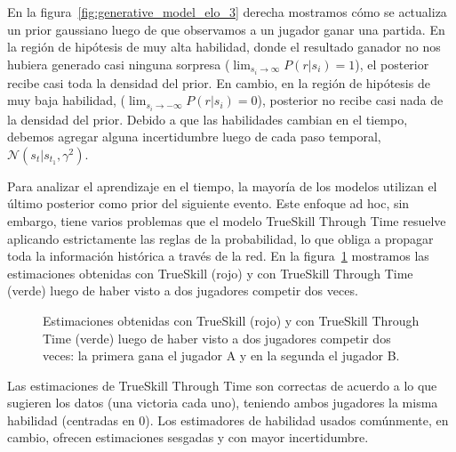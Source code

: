 \documentclass[a4paper,11pt]{book}
\newcommand{\N}{\mathcal{N}}
\theoremstyle{definition}
\begin{document}

En la figura~\ref{fig:generative_model_elo_3} derecha mostramos c\'omo se actualiza un prior gaussiano luego de que observamos a un jugador ganar una partida.
%
En la regi\'on de hip\'otesis de muy alta habilidad, donde el resultado ganador no nos hubiera generado casi ninguna sorpresa ($\lim_{s_i \to \infty}P(r|s_i) = 1$), el posterior recibe casi toda la densidad del prior.
%
En cambio, en la regi\'on de hip\'otesis de muy baja habilidad, ($\lim_{s_i \to -\infty}P(r|s_i) = 0$), posterior no recibe casi nada de la densidad del prior.
%
Debido a que las habilidades cambian en el tiempo, debemos agregar alguna incertidumbre luego de cada paso temporal, $\N(s_t | s_{t_1}, \gamma^2)$.


Para analizar el aprendizaje en el tiempo, la mayor\'ia de los modelos utilizan el \'ultimo posterior como prior del siguiente evento.
%
Este enfoque ad hoc, sin embargo, tiene varios problemas que el modelo TrueSkill Through Time resuelve aplicando estrictamente las reglas de la probabilidad, lo que obliga a propagar toda la informaci\'on hist\'orica a trav\'es de la red.
%
En la figura~\ref{fig:trueskillthroughtime} mostramos las estimaciones obtenidas con TrueSkill (rojo) y con TrueSkill Through Time (verde) luego de haber visto a dos jugadores competir dos veces.
%
\begin{figure}[ht!]
\centering
{}
\caption{
 Estimaciones obtenidas con TrueSkill (rojo) y con TrueSkill Through Time (verde) luego de haber visto a dos jugadores competir dos veces: la primera gana el jugador A y en la segunda el jugador B.
}
\label{fig:trueskillthroughtime}
\end{figure}
%
Las estimaciones de TrueSkill Through Time son correctas de acuerdo a lo que sugieren los datos (una victoria cada uno), teniendo ambos jugadores la misma habilidad (centradas en 0).
%
Los estimadores de habilidad usados com\'unmente, en cambio, ofrecen estimaciones sesgadas y con mayor incertidumbre.
\end{document}
